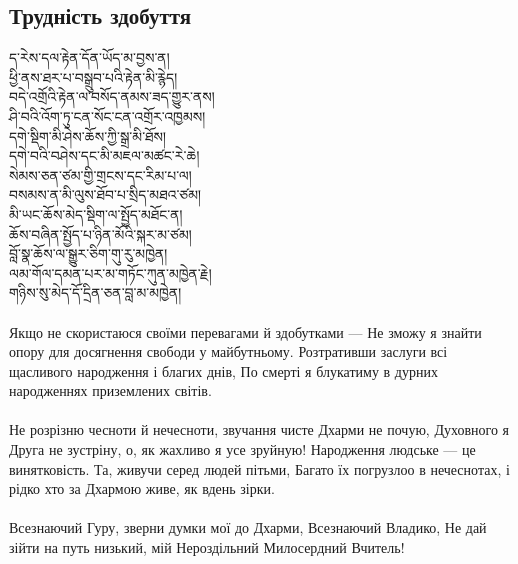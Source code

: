 \subsection*{Трудність здобуття}
\ti ད་རེས་དལ་རྟེན་དོན་ཡོད་མ་བྱས་ན།\\
ཕྱི་ནས་ཐར་པ་བསྒྲུབ་པའི་རྟེན་མི་རྙེད།\\
བདེ་འགྲོའི་རྟེན་ལ་བསོད་ནམས་ཟད་གྱུར་ནས།\\
ཤི་བའི་འོག་ཏུ་ངན་སོང་ངན་འགྲོར་འཁྱམས།\\
དགེ་སྡིག་མི་ཤེས་ཆོས་ཀྱི་སྒྲ་མི་ཐོས།\\
དགེ་བའི་བཤེས་དང་མི་མཇལ་མཚང་རེ་ཆེ།\\
སེམས་ཅན་ཙམ་གྱི་གྲངས་དང་རིམ་པ་ལ།\\
བསམས་ན་མི་ལུས་ཐོབ་པ་སྲིད་མཐའ་ཙམ།\\
མི་ཡང་ཆོས་མེད་སྡིག་ལ་སྤྱོད་མཐོང་ན།\\
ཆོས་བཞིན་སྤྱོད་པ་ཉིན་མོའི་སྐར་མ་ཙམ།\\
བློ་སྣ་ཆོས་ལ་སྒྱུར་ཅིག་གུ་རུ་མཁྱེན།\\
ལམ་གོལ་དམན་པར་མ་གཏོང་ཀུན་མཁྱེན་རྗེ།\\
གཉིས་སུ་མེད་དོ་དྲིན་ཅན་བླ་མ་མཁྱེན།\\
\\
\ru
Якщо не скористаюся своїми перевагами й здобутками ---
Не зможу я знайти опору для досягнення свободи у майбутньому.
Розтративши заслуги всі щасливого народження і благих днів,
По смерті я блукатиму в дурних народженнях приземлених світів. \\
\\
Не розрізню чесноти й нечесноти, звучання чисте Дхарми не почую,
Духовного я Друга не зустріну, о, як жахливо я усе зруйную!
Народження людське --- це винятковість. Та, живучи серед людей пітьми,
Багато їх погрузлоо в нечеснотах, і рідко хто за Дхармою живе, як вдень зірки.\\
\\
Всезнаючий Гуру, зверни думки мої до Дхарми, Всезнаючий Владико,
Не дай зійти на путь низький, мій Нероздільний Милосердний Вчитель!\\

\newpage
